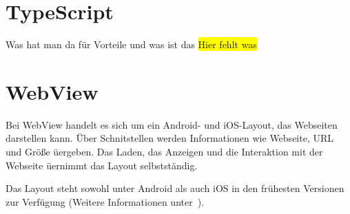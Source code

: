 \section{TypeScript}
Was hat man da für Vorteile und was ist das
\colorbox{yellow}{Hier fehlt was}

\section{WebView}
Bei WebView handelt es sich um ein Android- und iOS-Layout, das Webseiten darstellen kann. Über Schnitstellen werden
Informationen wie Webseite, URL und Größe üergeben. Das Laden, das Anzeigen und die Interaktion mit der Webseite üernimmt
das Layout selbstständig.

Das Layout steht sowohl unter Android als auch iOS in den frühesten Versionen zur Verfügung (Weitere Informationen
unter~\cite{online_grundlagen_webview}).